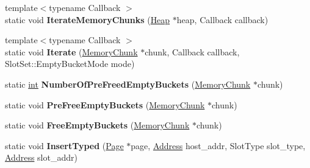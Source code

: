 \begin{DoxyCompactItemize}
\mbox{\label{classv8_1_1internal_1_1RememberedSet_a1d5253b451545ec2e5fc960b42d00870}} 
{\footnotesize template$<$typename Callback $>$ }\\static void {\bfseries Iterate\+Memory\+Chunks} (\mbox{\hyperlink{classv8_1_1internal_1_1Heap}{Heap}} $\ast$heap, Callback callback)
\item 
\mbox{\label{classv8_1_1internal_1_1RememberedSet_a0c6cce464a23684f2d8ffa31536fdf5b}} 
{\footnotesize template$<$typename Callback $>$ }\\static void {\bfseries Iterate} (\mbox{\hyperlink{classv8_1_1internal_1_1MemoryChunk}{Memory\+Chunk}} $\ast$chunk, Callback callback, Slot\+Set\+::\+Empty\+Bucket\+Mode mode)
\item 
\mbox{\label{classv8_1_1internal_1_1RememberedSet_a23f4106a191a0ae4d0c110cbce1b235b}} 
static \mbox{\hyperlink{classint}{int}} {\bfseries Number\+Of\+Pre\+Freed\+Empty\+Buckets} (\mbox{\hyperlink{classv8_1_1internal_1_1MemoryChunk}{Memory\+Chunk}} $\ast$chunk)
\item 
\mbox{\label{classv8_1_1internal_1_1RememberedSet_a6473ebd18767be6d343014ed334a3529}} 
static void {\bfseries Pre\+Free\+Empty\+Buckets} (\mbox{\hyperlink{classv8_1_1internal_1_1MemoryChunk}{Memory\+Chunk}} $\ast$chunk)
\item 
\mbox{\label{classv8_1_1internal_1_1RememberedSet_ad82eb049f075f20b7036f7fe9989afc5}} 
static void {\bfseries Free\+Empty\+Buckets} (\mbox{\hyperlink{classv8_1_1internal_1_1MemoryChunk}{Memory\+Chunk}} $\ast$chunk)
\item 
\mbox{\label{classv8_1_1internal_1_1RememberedSet_a953537496457d7ef63607ef3607cb0ed}} 
static void {\bfseries Insert\+Typed} (\mbox{\hyperlink{classv8_1_1internal_1_1Page}{Page}} $\ast$page, \mbox{\hyperlink{classuintptr__t}{Address}} host\+\_\+addr, Slot\+Type slot\+\_\+type, \mbox{\hyperlink{classuintptr__t}{Address}} slot\+\_\+addr)
\item 
\mbox{\label{classv8_1_1internal_1_1RememberedSet_aa299467ca0ddbf9356f865807aaa753e}} 

\end{DoxyCompactItemize}
